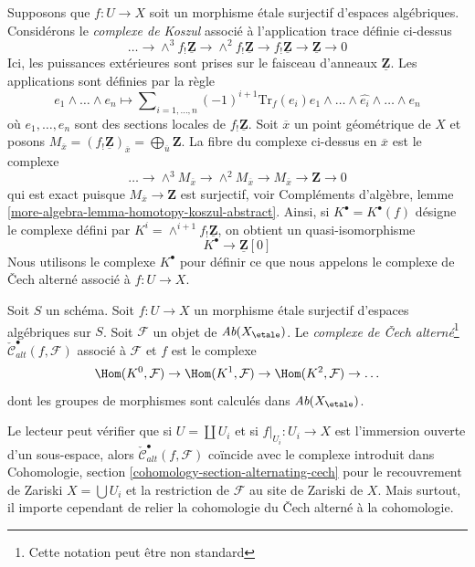 \medskip\noindent
Supposons que $f : U \to X$ soit un morphisme étale surjectif
d'espaces algébriques. Considérons le {\it complexe de Koszul}
associé à l'application trace définie ci-dessus
$$
\ldots \to \wedge^3f_!\underline{\mathbf{Z}} \to
\wedge^2f_!\underline{\mathbf{Z}} \to f_!\underline{\mathbf{Z}} \to
\underline{\mathbf{Z}} \to 0
$$
Ici, les puissances extérieures sont prises sur le faisceau d'anneaux $\underline{\mathbf{Z}}$.
Les applications sont définies par la règle
$$
e_1 \wedge \ldots \wedge e_n \longmapsto
\sum\nolimits_{i = 1, \ldots, n} (-1)^{i + 1}
\text{Tr}_f(e_i)
e_1 \wedge \ldots \wedge \widehat{e_i} \wedge \ldots \wedge e_n
$$
où $e_1, \ldots, e_n$ sont des sections locales de $f_!\underline{\mathbf{Z}}$.
Soit $\overline{x}$ un point géométrique de $X$ et posons
$M_{\overline{x}} = (f_!\underline{\mathbf{Z}})_{\overline{x}} =
\bigoplus_{\overline{u}} \mathbf{Z}$. La fibre du complexe ci-dessus en
$\overline{x}$ est le complexe
$$
\ldots \to \wedge^3 M_{\overline{x}} \to \wedge^2 M_{\overline{x}}
\to M_{\overline{x}} \to \mathbf{Z} \to 0
$$
qui est exact puisque $M_{\overline{x}} \to \mathbf{Z}$ est surjectif, voir
Compléments d'algèbre, lemme \ref{more-algebra-lemma-homotopy-koszul-abstract}.
Ainsi, si $K^\bullet = K^\bullet(f)$ désigne le complexe défini par
$K^i = \wedge^{i + 1}f_!\underline{\mathbf{Z}}$, on obtient un
quasi-isomorphisme
\begin{equation}
\label{equation-quasi-isomorphism}
K^\bullet \longrightarrow \underline{\mathbf{Z}}[0]
\end{equation}
Nous utilisons le complexe $K^\bullet$ pour définir ce que nous appelons
le complexe de {\v C}ech alterné associé à $f : U \to X$.

\begin{definition}
\label{definition-alternating-cech-complex}
Soit $S$ un schéma. Soit $f : U \to X$ un morphisme étale surjectif
d'espaces algébriques sur $S$. Soit $\mathcal{F}$ un objet de
$\textit{Ab}(X_\etale)$. Le
{\it complexe de {\v C}ech alterné}\footnote{Cette notation peut être non standard}
$\check{\mathcal{C}}^\bullet_{alt}(f, \mathcal{F})$
associé à $\mathcal{F}$ et $f$ est le complexe
$$
\Hom(K^0, \mathcal{F}) \to \Hom(K^1, \mathcal{F}) \to
\Hom(K^2, \mathcal{F}) \to \ldots
$$
dont les groupes de morphismes sont calculés dans $\textit{Ab}(X_\etale)$.
\end{definition}

\noindent
Le lecteur peut vérifier que si $U = \coprod U_i$ et si $f|_{U_i} : U_i \to X$
est l'immersion ouverte d'un sous-espace, alors
$\check{\mathcal{C}}_{alt}^\bullet(f, \mathcal{F})$ coïncide avec le complexe
introduit dans
Cohomologie, section \ref{cohomology-section-alternating-cech}
pour le recouvrement de Zariski $X = \bigcup U_i$ et la restriction
de $\mathcal{F}$ au site de Zariski de $X$. Mais surtout,
il importe cependant de relier la cohomologie du
{\v C}ech alterné à la cohomologie.


